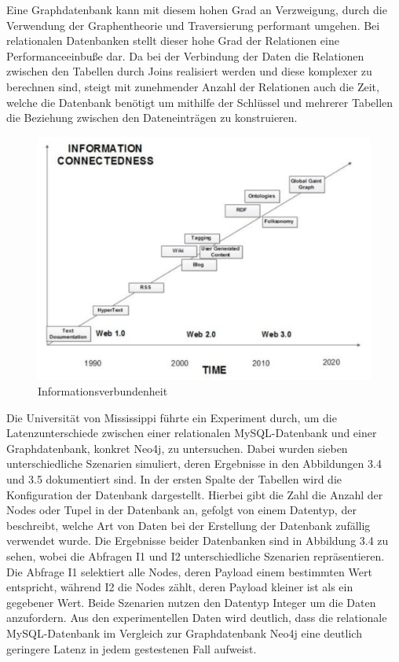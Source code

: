 \noindent
Eine Graphdatenbank kann mit diesem hohen Grad an Verzweigung, durch die Verwendung der Graphentheorie und Traversierung performant umgehen.  Bei relationalen Datenbanken stellt dieser hohe Grad der Relationen eine Performanceeinbuße dar.  Da bei der Verbindung der Daten die Relationen zwischen den Tabellen durch Joins realisiert werden und diese komplexer zu berechnen sind, steigt mit zunehmender Anzahl der Relationen auch die Zeit, welche die Datenbank benötigt um mithilfe der Schlüssel und mehrerer Tabellen die Beziehung zwischen den Dateneinträgen zu konstruieren. \citep{9677042} \citep{graphdb}
\begin{figure}[H]
	\centering
	\includegraphics[scale=.45]{Illustrations/informationconnectedness.png}
	\caption{Informationsverbundenheit \citep{performancenosql}}
\end{figure}
\noindent
Die Universität von Mississippi führte ein Experiment durch, um die Latenzunterschiede zwischen einer relationalen MySQL-Datenbank und einer Graphdatenbank, konkret Neo4j, zu untersuchen. Dabei wurden sieben unterschiedliche Szenarien simuliert, deren Ergebnisse in den Abbildungen 3.4 und 3.5 dokumentiert sind. In der ersten Spalte der Tabellen wird die Konfiguration der Datenbank dargestellt. Hierbei gibt die Zahl die Anzahl der Nodes oder Tupel in der Datenbank an, gefolgt von einem Datentyp, der beschreibt, welche Art von Daten bei der Erstellung der Datenbank zufällig verwendet wurde.
Die Ergebnisse beider Datenbanken sind in Abbildung 3.4 zu sehen, wobei die Abfragen I1 und I2 unterschiedliche Szenarien repräsentieren. Die Abfrage I1 selektiert alle Nodes, deren Payload einem bestimmten Wert entspricht, während I2 die Nodes zählt, deren Payload kleiner ist als ein gegebener Wert. Beide Szenarien nutzen den Datentyp Integer um die Daten anzufordern. Aus den experimentellen Daten wird deutlich, dass die relationale MySQL-Datenbank im Vergleich zur Graphdatenbank Neo4j eine deutlich geringere Latenz in jedem gestestenen Fall aufweist.
